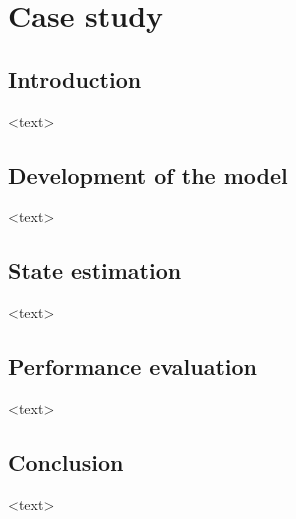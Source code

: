 \chapter{Case study}
\label{chap-casestudy}


\section{Introduction
}

<text>



\section{Development of the model}

<text>



\section{State estimation}

<text>



\section{Performance evaluation}

<text>



\section{Conclusion}

<text>



